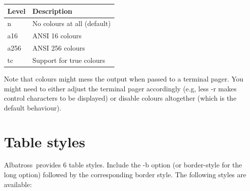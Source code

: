 \documentclass[12pt,article,a4paper,oneside]{memoir}
\newcommand{\albatross}{Albatross}
\newcommand{\command}[1]{{\ttfamily#1}}
\newcommand{\val}[1]{{\ttfamily#1}}
\newcommand{\shortopt}[1]{{\ttfamily-#1}}
\newcommand{\longopt}[1]{{\ttfamily{-}{-}#1}}
\begin{document}
\bigskip
\bigskip

{\centering
\begin{tabular}{@{}ll@{}}
\toprule
Level & Description\\
\midrule
\val{n} & No colours at all (default)\\
\val{a16} & ANSI 16 colours\\
\val{a256} & ANSI 256 colours\\
\val{tc} & Support for true colours\\
\bottomrule
\end{tabular}\par}

\bigskip
\bigskip

Note that colours might mess the output when passed to a terminal pager. You
might need to either adjust the terminal pager accordingly (e.g, \command{less
-r} makes control characters to be displayed) or disable colours altogether
(which is the default behaviour).

\section{Table styles}
\label{sec:tablestyles}

\albatross\ provides 6 table styles. Include the \shortopt{b} option (or
\longopt{border-style} for the long option) followed by the corresponding border
style. The following styles are available:
\end{document}

